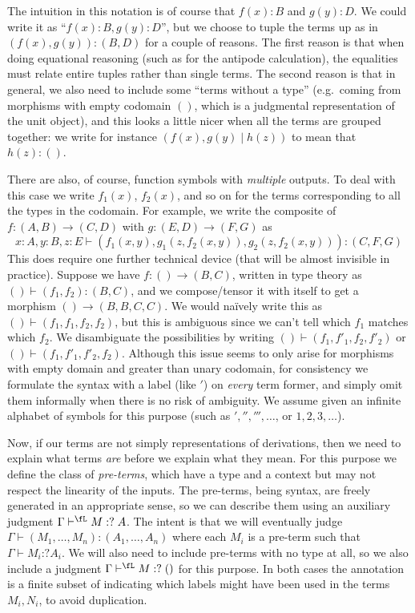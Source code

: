 \documentclass{book}
\let\types\vdash
\newcommand{\pc}{\mathrel{\mathord{:}?}}
\begin{document}
The intuition in this notation is of course that $f(x):B$ and $g(y):D$.
We could write it as ``$f(x):B,g(y):D$'', but we choose to tuple the terms up as in $(f(x),g(y)):(B,D)$ for a couple of reasons.
The first reason is that when doing equational reasoning (such as for the antipode calculation), the equalities must relate entire tuples rather than single terms.
The second reason is that in general, we also need to include some ``terms without a type'' (e.g.\ coming from morphisms with empty codomain $()$, which is a judgmental representation of the unit object), and this looks a little nicer when all the terms are grouped together: we write for instance $(f(x),g(y)\mid h(z))$ to mean that $h(z):()$.

There are also, of course, function symbols with \emph{multiple} outputs.
To deal with this case we write $f_1(x)$, $f_2(x)$, and so on for the terms corresponding to all the types in the codomain.
For example, we write the composite of $f:(A,B) \to (C,D)$ with $g:(E,D)\to (F,G)$ as
\[ x:A, y:B, z:E \types (f_1(x,y),g_1(z,f_2(x,y)),g_2(z,f_2(x,y))):(C,F,G) \]
This does require one further technical device (that will be almost invisible in practice).
Suppose we have $f:()\to (B,C)$, written in type theory as $()\types (f_1,f_2):(B,C)$, and we compose/tensor it with itself to get a morphism $() \to (B,B,C,C)$.
We would na\"ively write this as $() \types (f_1,f_1,f_2,f_2)$, but this is ambiguous since we can't tell which $f_1$ matches which $f_2$.
We disambiguate the possibilities by writing $() \types (f_1,f'_1,f_2,f'_2)$ or $() \types (f_1,f'_1,f'_2,f_2)$.
Although this issue seems to only arise for morphisms with empty domain and greater than unary codomain, for consistency we formulate the syntax with a label (like $'$) on \emph{every} term former, and simply omit them informally when there is no risk of ambiguity.
We assume given an infinite alphabet of symbols \fA for this purpose (such as $','',''',\dots$, or $1,2,3,\dots$).

Now, if our terms are not simply representations of derivations, then we need to explain what terms \emph{are} before we explain what they mean.
For this purpose we define the class of \emph{pre-terms}, which have a type and a context but may not respect the linearity of the inputs.
The pre-terms, being syntax, are freely generated in an appropriate sense, so we can describe them using an auxiliary judgment $\Gamma \types^\fL M\pc A$.
The intent is that we will eventually judge $\Gamma \types (M_1,\dots,M_n):(A_1,\dots,A_n)$ where each $M_i$ is a pre-term such that $\Gamma \types M_i\pc A_i$.
We will also need to include pre-terms with no type at all, so we also include a judgment $\Gamma \types^\fL M\pc ()$ for this purpose.
In both cases the annotation \fL is a finite subset of \fA indicating which labels might have been used in the terms $M_i,N_i$, to avoid duplication.
\end{document}
